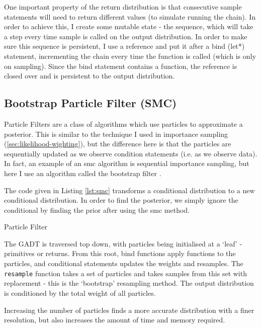 \documentclass[sigconf]{acmart}
\begin{document}
One important property of the return distribution is that consecutive sample statements will need to return different values (to simulate running the chain). In order to achieve this, I create some mutable state - the sequence, which will take a step every time sample is called on the output distribution. In order to make sure this sequence is persistent, I use a reference and put it after a bind (let*) statement, incrementing the chain every time the function is called (which is only on sampling). Since the bind statement contains a function, the reference is closed over and is persistent to the output distribution.


\subsection{Bootstrap Particle Filter (SMC)} \label{sec:pf}
Particle Filters are a class of algorithms which use particles to approximate a posterior. This is similar to the technique I used in importance sampling (\ref{sec:likelihood-wighting}), but the difference here is that the particles are sequentially updated as we observe condition statements (i.e. as we observe data). In fact, an example of an smc algorithm is sequential importance sampling, but here I use an algorithm called the bootstrap filter \cite{particlefilter}.

The code given in Listing \ref{lst:smc} transforms a conditional distribution to a new conditional distribution. In order to find the posterior, we simply ignore the conditional by finding the prior after using the smc method.

\begin{listing}[!htb]
  \centering
  \caption{Particle Filter}
  \label{lst:smc}
\end{listing}

The GADT is traversed top down, with particles being initialised at a `leaf' - primitives or returns. From this root, bind functions apply functions to the particles, and conditional statements updates the weights and resamples. The \texttt{resample} function takes a set of particles and takes samples from this set with replacement - this is the `bootstrap' resampling method. The output distribution is conditioned by the total weight of all particles.

Increasing the number of particles finds a more accurate distribution with a finer resolution, but also increases the amount of time and memory required.
\end{document}
